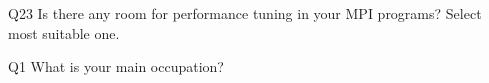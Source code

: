 \begin{description}%
\item{Q23} Is there any room for performance tuning in your MPI programs? Select most suitable one.%
\item{Q1} What is your main occupation?%
\end{description}%

